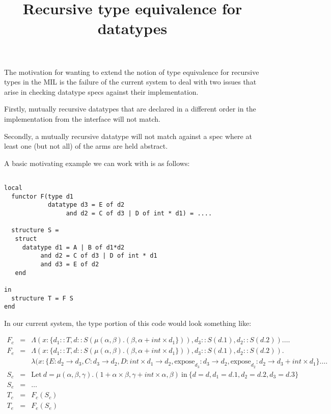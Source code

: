 \documentclass[12pt,twoside,fleqn]{article}
\title{Recursive type equivalence for datatypes}
\begin{document}
\maketitle

The motivation for wanting to extend the notion of type equivalence
for recursive types in the MIL is the failure of the current system to
deal with two issues that arise in checking datatype specs against
their implementation.

Firstly, mutually recursive datatypes that are declared in a different
order in the implementation from the interface will not match.

Secondly, a mutually recursive datatype will not match against a spec
where at least one (but not all) of the arms are held abstract.

A basic motivating example we can work with is as follows:

\begin{verbatim}

local
  functor F(type d1
            datatype d3 = E of d2
                 and d2 = C of d3 | D of int * d1) = ....

  structure S = 
   struct
     datatype d1 = A | B of d1*d2
          and d2 = C of d3 | D of int * d1
          and d3 = E of d2
   end

in
  structure T = F S
end
\end{verbatim}

In our current system, the type portion of this code would look
something like:


\begin{eqnarray*}
  F_c & = & 
  \Lambda(x:\{d_1::T,d::S(\mu(\alpha,\beta).(\beta,\alpha+int\times d_1\})),d_3::S(d.1),d_2::S(d.2)). \ldots \\
  F_e & = &
  \Lambda(x:\{d_1::T,d::S(\mu(\alpha,\beta).(\beta,\alpha+int\times d_1\})),d_3::S(d.1),d_2::S(d.2)). \\
  &&
  \lambda(x:\{E:d_2 \to d_3,C:d_3 \to d_2,D : int \times d_1 \to d_2,
              \mathrm{expose}_{d_3}:d_3 \to d_2,
              \mathrm{expose}_{d_2}:d_2 \to d_3 + int \times  d_1\}. \ldots \\
  S_c  & = & \mathrm{Let}\ d = \mu(\alpha,\beta,\gamma).
                               (1+\alpha \times \beta,
                               \gamma + int \times \alpha,
                               \beta)
             \mathrm{\ in\ } \{d = d,d_1=d.1,d_2=d.2,d_3 = d.3\} \\
  S_e & = & \ldots \\
  T_c & = & F_c(S_c) \\
  T_e & = & F_e(S_e)
\end{eqnarray*}
\end{document}
